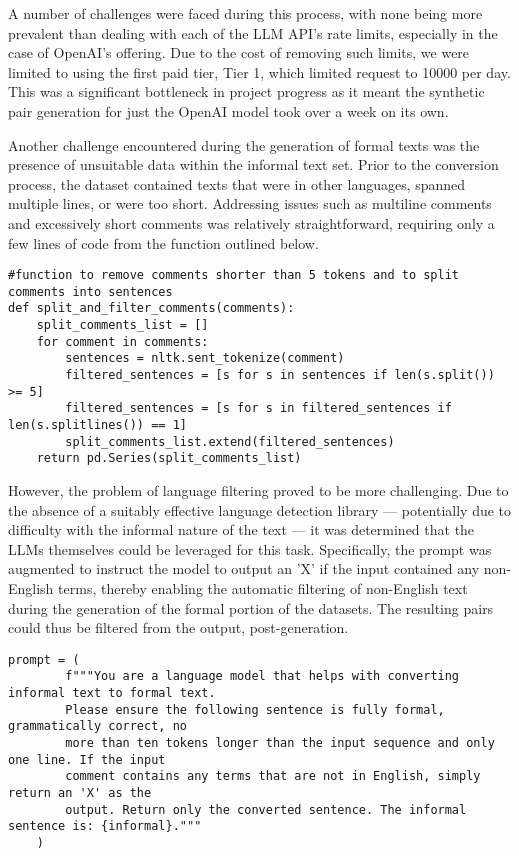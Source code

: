 \documentclass[a4paper,9pt]{scrartcl}
\begin{document}
A number of challenges were faced during this process, with none being more prevalent than dealing with 
each of the LLM API's rate limits, especially in the case of OpenAI's offering. Due to the cost of removing 
such limits, we were limited to using the first paid tier, Tier 1, which limited request to 10000 per day. 
This was a significant bottleneck in project progress as it meant the synthetic pair generation for just 
the OpenAI model took over a week on its own. 

Another challenge encountered during the generation of formal texts was the presence of unsuitable data 
within the informal text set. Prior to the conversion process, the dataset contained texts that were in 
other languages, spanned multiple lines, or were too short. Addressing issues such as multiline comments 
and excessively short comments was relatively straightforward, requiring only a few lines of code from the
function outlined below.

\begin{lstlisting}
#function to remove comments shorter than 5 tokens and to split comments into sentences
def split_and_filter_comments(comments):
    split_comments_list = []
    for comment in comments:
        sentences = nltk.sent_tokenize(comment)
        filtered_sentences = [s for s in sentences if len(s.split()) >= 5]
        filtered_sentences = [s for s in filtered_sentences if len(s.splitlines()) == 1]
        split_comments_list.extend(filtered_sentences)
    return pd.Series(split_comments_list)
  \end{lstlisting}

  
However, the problem of language filtering proved to be more challenging. Due to the absence of a 
suitably effective language detection library — potentially due to difficulty with the 
informal nature of the text — it was determined that the LLMs themselves could be leveraged for this task. 
Specifically, the prompt was augmented to instruct the model to output an 'X' if the input contained 
any non-English terms, thereby enabling the automatic filtering of non-English text during the generation
of the formal portion of the datasets. The resulting pairs could thus be filtered from the output, 
post-generation. 

\begin{lstlisting}
prompt = (
        f"""You are a language model that helps with converting informal text to formal text.
        Please ensure the following sentence is fully formal, grammatically correct, no 
        more than ten tokens longer than the input sequence and only one line. If the input
        comment contains any terms that are not in English, simply return an 'X' as the 
        output. Return only the converted sentence. The informal sentence is: {informal}."""
    )
\end{lstlisting}
\end{document}
